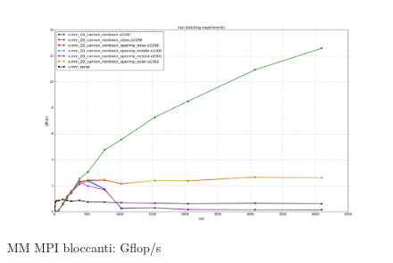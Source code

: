 \begin{figure}[htbp]
    \begin{center}
        \includegraphics[width=15cm]{immagini/non_blocking_gflops.png}
    \end{center}
    \caption{MM MPI bloccanti: Gflop/s}
    \label{fig:non_blocking_gflops}
\end{figure}
